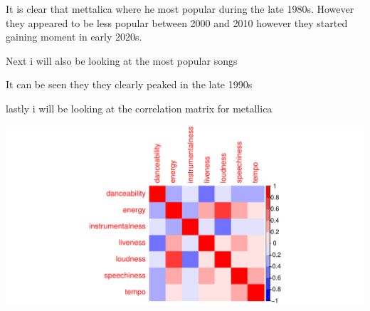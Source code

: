 \documentclass[12pt,preprint, authoryear]{elsarticle}
\let\origfigure\figure
\let\endorigfigure\endfigure
\renewenvironment{figure}[1][2] {
    \expandafter\origfigure\expandafter[H]
} {
    \endorigfigure
}
\numberwithin{equation}{section}
\numberwithin{figure}{section}
\numberwithin{table}{section}
\begin{document}
It is clear that mettalica where he most popular during the late 1980s.
However they appeared to be less popular between 2000 and 2010 however
they started gaining moment in early 2020s.

Next i will also be looking at the most popular songs

It can be seen they they clearly peaked in the late 1990s

lastly i will be looking at the correlation matrix for metallica

\begin{figure}[H]

{\centering \includegraphics{Q3_files/figure-latex/Figure6-1} 

}

\caption{Correlation matrix  \label{Figure6}}\label{fig:Figure6}
\end{figure}


\end{document}
